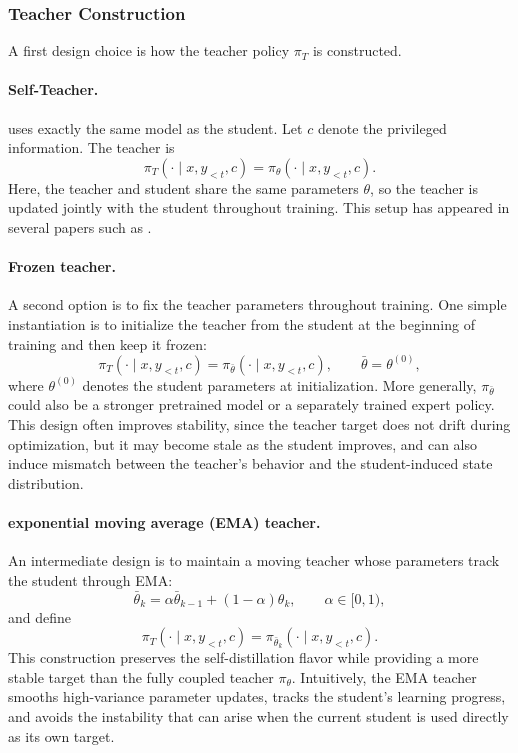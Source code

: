 \subsubsection{Teacher Construction}

A first design choice is how the teacher policy $\pi_T$ is constructed.

\paragraph{Self-Teacher.} uses exactly the same model as the student. Let $c$ denote the privileged information. The teacher is
\[
\pi_T(\cdot \mid x, y_{<t}, c)
=
\pi_\theta(\cdot \mid x, y_{<t}, c).
\]
Here, the teacher and student share the same parameters $\theta$, so the teacher is updated jointly with the student throughout training. This setup has appeared in several papers such as \cite{zhao2026selfdistilledreasoneronpolicyselfdistillation,ye2026onpolicycontextdistillationlanguage}.

\paragraph{Frozen teacher.}
A second option is to fix the teacher parameters throughout training. One simple instantiation is to initialize the teacher from the student at the beginning of training and then keep it frozen:
\[
\pi_T(\cdot \mid x, y_{<t}, c)
=
\pi_{\bar{\theta}}(\cdot \mid x, y_{<t}, c),
\qquad
\bar{\theta} = \theta^{(0)},
\]
where $\theta^{(0)}$ denotes the student parameters at initialization. More generally, $\pi_{\bar{\theta}}$ could also be a stronger pretrained model or a separately trained expert policy. This design often improves stability, since the teacher target does not drift during optimization, but it may become stale as the student improves, and can also induce mismatch between the teacher's behavior and the student-induced state distribution.

\paragraph{exponential moving average (EMA) teacher.}

An intermediate design is to maintain a moving teacher whose parameters track the student through EMA:
\[
\bar{\theta}_{k}
=
\alpha \bar{\theta}_{k-1} + (1-\alpha)\theta_k,
\qquad \alpha \in [0,1),
\]
and define
\[
\pi_T(\cdot \mid x, y_{<t}, c)
=
\pi_{\bar{\theta}_k}(\cdot \mid x, y_{<t}, c).
\]
This construction preserves the self-distillation flavor while providing a more stable target than the fully coupled teacher $\pi_\theta$. Intuitively, the EMA teacher smooths high-variance parameter updates, tracks the student's learning progress, and avoids the instability that can arise when the current student is used directly as its own target. \cite{shenfeld2026selfdistillationenablescontinuallearning,hubotter2026reinforcementlearningselfdistillation}

